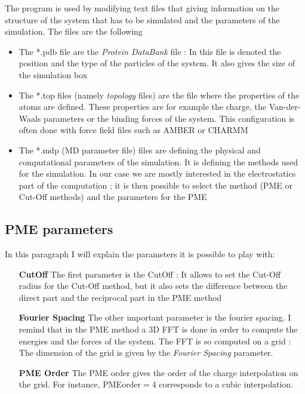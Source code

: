 \documentclass[10pt,twoside,a4paper]{report}
\begin{document}
	 The program is used  by modifying text files that giving information on the structure of the system that has to be simulated and the parameters of the simulation. The files are the following 
	 
	\begin{itemize}
	
	\item The *.pdb file are the \textit{Protein DataBank} file : In this file is denoted the position and the type of the particles of the system. It also gives the size of the simulation box

	\item The *.top files (namely \textit{topology} files) are the file where the properties of the atoms are defined. These properties are for example the charge, the Van-der-Waals parameters or the binding forces of the system. This configuration is often done with force field files such as AMBER or CHARMM
		 
	\item The *.mdp (MD parameter file) files are defining the physical and computational parameters of the simulation. It is defining the methods used for the simulation. In our case we are mostly interested in the electrostatics part of the computation ; it is then possible to select the method (PME or Cut-Off methods) and the parameters for the PME
	
	\end{itemize}
		
	\subsection{PME parameters}
	
	In this paragraph I will explain the parameters it is possible to play with:
	
	\begin{enumerate}
	

	\item[\textbf{CutOff}] The first parameter is the CutOff : It allows to set the Cut-Off radius for the Cut-Off method, but it also sets the difference between the direct part and the reciprocal part in the PME method
	
	\item[\textbf{Fourier Spacing}] The other important parameter is the fourier spacing. I remind that in the PME method a 3D FFT is done in order to compute the energies and the forces of the system. The FFT is so computed on a grid : The dimension of the grid is given by the \textit{Fourier Spacing} parameter.
	
	\item[\textbf{PME Order}] The PME order gives the order of the charge interpolation on the grid. For instance, PMEorder$= 4$ corresponds to a cubic interpolation. 		
	
	\end{enumerate}
	
\end{document}
